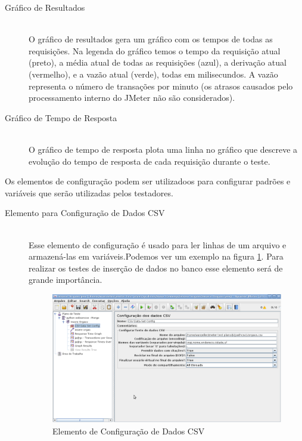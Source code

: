 \begin{description}
\item[Gráfico de Resultados] \hfill \\

O gráfico de resultados gera um gráfico com os tempos de todas as requisições. Na legenda do gráfico temos o tempo da requisição atual (preto), a média atual de todas as requisições (azul), a derivação atual (vermelho), e a vazão atual (verde), todas em milisecundos. A vazão representa o número de transações por minuto (os atrasos causados pelo processamento interno do JMeter não são considerados).

\item[Gráfico de Tempo de Resposta] \hfill \\

O gráfico de tempo de resposta plota uma linha no gráfico que descreve a evolução do tempo de resposta de cada requisição durante o teste.
\end{description}

Os elementos de configuração podem ser utilizadoos para configurar padrões e variáveis que serão utilizadas pelos testadores.

\begin{description}
\item[Elemento para Configuração de Dados CSV] \hfill \\

Esse elemento de configuração é usado para ler linhas de um arquivo e armazená-las em variáveis.Podemos ver um exemplo na figura \ref{fig:configuracao_csv}. Para realizar os testes de inserção de dados no banco esse elemento será de grande importância.

	\begin{figure}[!htbp]
		\begin{center}
			\includegraphics[width=1\textwidth]{configuracao_csv}
		\end{center}
		\caption{Elemento de Configuração de Dados CSV}
		\label{fig:configuracao_csv}
	\end{figure}
	
\end{description}














